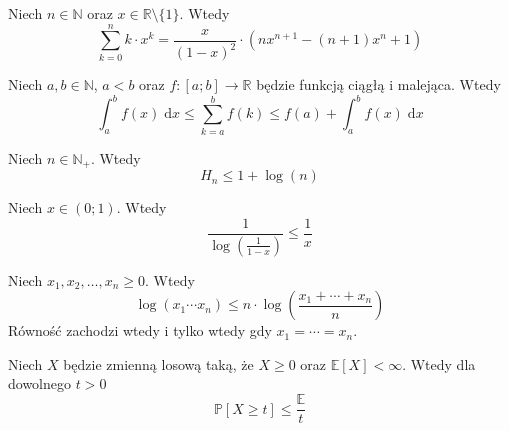 
\begin{summ}\label{summ:geo_1}
Niech $n\in\mathbb{N}$ oraz $x\in\mathbb{R}\setminus\{1\}$. Wtedy
\[
    \sum_{k=0}^{n} k\cdot x^k=\frac{x}{{(1-x)}^2}\cdot (nx^{n+1}-(n+1)x^n+1)
\]
\end{summ}



\begin{inequality}\label{inequality:approximation_of_sum_by_an_integral}
Niech $a,b\in\mathbb{N}$, $a<b$ oraz $f:[a;b]\to\mathbb{R}$ będzie funkcją ciągłą i malejąca. Wtedy
\[
    \int_{a}^b f(x)\; \mathrm{d}x \le \sum_{k=a}^{b} f(k)\le f(a) + \int_{a}^b f(x)\; \mathrm{d}x
\]
\end{inequality}

\begin{inequality}\label{inequality:harmonic_upper_bound}
Niech $n\in\mathbb{N}_+$. Wtedy
\[
    H_n \le 1 + \log(n)
\]
\end{inequality}

\begin{inequality}\label{inequality:log_vs_x}
Niech $x \in (0;1)$. Wtedy
\[
    \frac{1}{\log(\frac{1}{1-x})} \le \frac{1}{x}
\]
\end{inequality}

\begin{inequality}\label{inequality:AM_GM}
Niech $x_1,x_2,\dots,x_n\ge 0$. Wtedy
\[
    \log(x_1\cdots x_n) \le n\cdot \log\left(\frac{x_1 + \cdots + x_n}{n}\right)
\]
Równość zachodzi wtedy i tylko wtedy gdy $x_1=\cdots=x_n$.
\end{inequality}

\begin{inequality}\label{inequality:Markov}
Niech $X$ będzie zmienną losową taką, że $X\ge 0$ oraz $\mathbb{E}[X]< \infty$. Wtedy dla dowolnego $t>0$
\[
    \mathbb{P}[X\ge t] \le \frac{\mathbb{E}}{t}
\]
\end{inequality}

